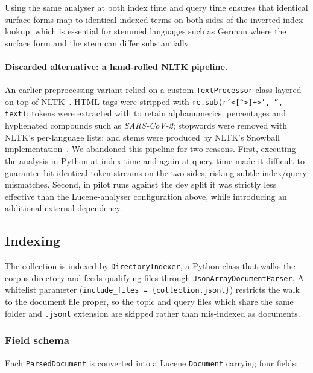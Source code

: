 Using the same analyser at both index time and query time ensures that
identical surface forms map to identical indexed terms on both sides
of the inverted-index lookup, which is essential for stemmed languages
such as German where the surface form and the stem can differ
substantially.

\paragraph{Discarded alternative: a hand-rolled NLTK pipeline.}
An earlier preprocessing variant relied on a custom
\texttt{TextProcessor} class layered on top of
NLTK~\citep{BirdLoper2004}.  HTML tags were stripped with
\texttt{re.sub(r'<[\textasciicircum>]+>', '', text)}; tokens were
extracted with to retain alphanumerics, percentages and hyphenated compounds such as
\textit{SARS-CoV-2}; stopwords were removed with NLTK's per-language
lists; and stems were produced by NLTK's Snowball
implementation~\citep{Porter2001Snowball}.  We abandoned this pipeline
for two reasons.  First, executing the analysis in Python at index
time and again at query time made it difficult to guarantee
bit-identical token streams on the two sides, risking subtle
index/query mismatches.  Second, in pilot runs against the dev split
it was strictly less effective than the Lucene-analyser configuration
above, while introducing an additional external dependency.

\subsection{Indexing}
\label{subsec:indexing}

The collection is indexed by \texttt{DirectoryIndexer}, a Python class
that walks the corpus directory and feeds qualifying files through
\texttt{JsonArrayDocumentParser}.  A whitelist parameter
(\texttt{include\_files = \{collection.jsonl\}}) restricts the walk to
the document file proper, so the topic and query files which share
the same folder and \texttt{.jsonl} extension are skipped rather than
mis-indexed as documents.

\subsubsection{Field schema}
Each \texttt{ParsedDocument} is converted into a Lucene
\texttt{Document} carrying four fields:

